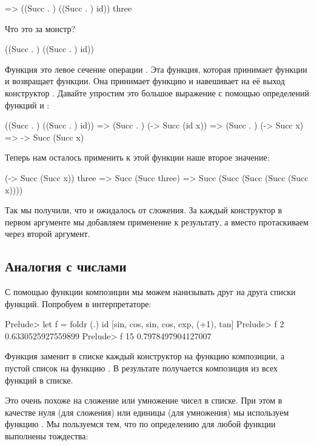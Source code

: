 \begin{code}
=>  ((Succ . ) ((Succ . ) id)) three
\end{code}

Что это за монстр?


\begin{code}
((Succ . ) ((Succ . ) id))
\end{code}

Функция  это левое сечение операции . Эта функция,
которая принимает функции и возвращает функции. Она принимает функцию и
навешивает на её выход конструктор . Давайте упростим это
большое выражение с помощью определений функций  и :


\begin{code}
    ((Succ . ) ((Succ . ) id))
=>   (Succ . ) (\x -> Succ (id x))
=>   (Succ . ) (\x -> Succ x)
=>   \x -> Succ (Succ x)
\end{code}

Теперь нам осталось применить к этой функции наше второе значение:


\begin{code}
    (\x -> Succ (Succ x)) three
=>  Succ (Succ three)
=>  Succ (Succ (Succ (Succ (Succ x))))
\end{code}

Так мы получили, что и ожидалось от сложения. За каждый конструктор
 в первом аргументе мы добавляем применение  к
результату, а вместо  протаскиваем через  второй
аргумент.

\subsection{Аналогия с числами}

С помощью функции композиции мы можем нанизывать друг на друга списки
функций. Попробуем в интерпретаторе:


\begin{code}
Prelude> let f = foldr (.) id [sin, cos, sin, cos, exp, (+1), tan]
Prelude> f 2
0.6330525927559899
Prelude> f 15
0.7978497904127007
\end{code}

Функция  заменит в списке каждый конструктор \In{(:)} на
функцию композиции, а пустой список на функцию . В результате
получается композиция из всех функций в списке.

Это очень похоже на сложение или умножение чисел в списке. При этом в
качестве нуля (для сложения) или единицы (для умножения) мы используем
функцию . Мы пользуемся тем, что по определению для любой функции
 выполнены тождества:


